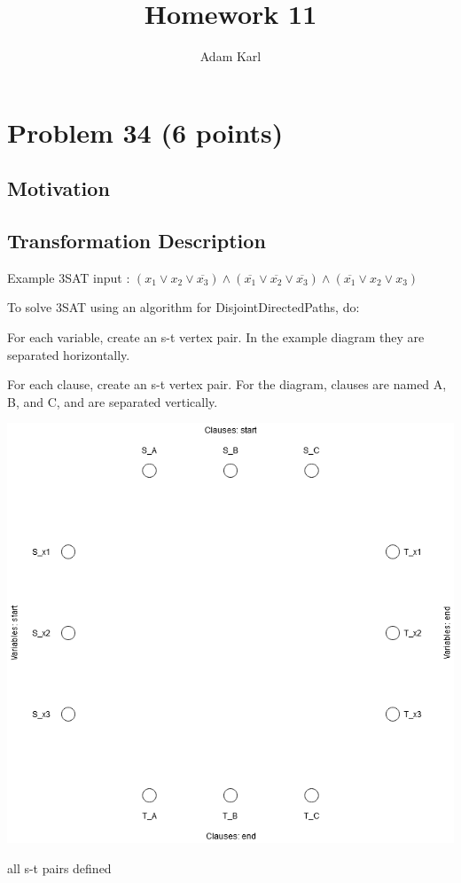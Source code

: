 \documentclass[a4paper]{article}
\title{Homework 11}
\author{Adam Karl}
\begin{document}
\maketitle

\section{Problem 34 (6 points)}
\subsection{Motivation}

\subsection{Transformation Description}
Example 3SAT input : $(x_1 \vee x_2 \vee \overline{x_3}) \wedge (\overline{x_1} \vee \overline{x_2} \vee \overline{x_3}) \wedge (\overline{x_1} \vee x_2 \vee x_3)$ 

To solve 3SAT using an algorithm for DisjointDirectedPaths, do:

For each variable, create an s-t vertex pair. In the example diagram they are separated horizontally.

For each clause, create an s-t vertex pair. For the diagram, clauses are named A, B, and C, and are separated vertically.

\begin{center}
    \includegraphics[scale=.5]{hw11-setup.png}
    
    \caption{all s-t pairs defined}
\end{center}
\end{document}
